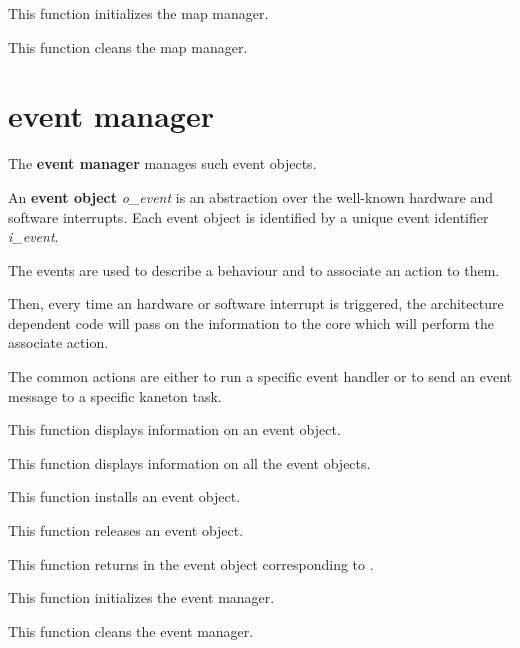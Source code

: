 	 {
	   This function initializes the map manager.
	 }

	 {
	   This function cleans the map manager.
	 }

%
%

\section{event manager}

The \textbf{event manager} manages such event objects.

An \textbf{event object} \textit{o\_event} is an abstraction over the
well-known hardware and software interrupts. Each event object is
identified by a unique event identifier \textit{i\_event}.

The events are used to describe a behaviour and to associate an action
to them.

Then, every time an hardware or software interrupt is triggered, the
architecture dependent code will pass on the information to the core
which will perform the associate action.

The common actions are either to run a specific event handler or to
send an event message to a specific kaneton task.

%
%

	 {
	   This function displays information on an event object.
	 }

	 {
	   This function displays information on all the event objects.
	 }

	 {
	   This function installs an event object.
	 }

	 {
	   This function releases an event object.
	 }

	 {
	   This function returns in  the event object
	   corresponding to .
	 }

	 {
	   This function initializes the event manager.
	 }

	 {
	   This function cleans the event manager.
	 }

